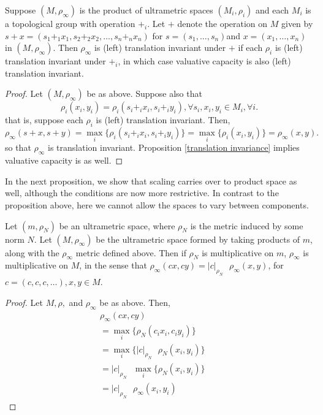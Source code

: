 \begin{proposition}
Suppose $(M,\rho_\infty)$ is the product of ultrametric spaces $(M_i, \rho_i)$ and each $M_i$ is a topological group with operation $+_i$. Let $+$ denote the operation on $M$ given by $s+x = (s_1 + _1 x_1, s_2 +_2 x_2, \ldots, s_n +_nx_n)$ for $s = (s_1,\ldots,s_n)$and $x =(x_1,\ldots,x_n)$ in $(M, \rho_\infty)$. Then $\rho_\infty$ is (left) translation invariant under $+$ if each $\rho_i$ is (left) translation invariant under $+_i$, in which case valuative capacity is also (left) translation invariant.
\end{proposition}

\begin{proof}
Let $(M,\rho_\infty)$ be as above. Suppose also that \[\rho_i(x_i,y_i) = \rho_i(s_i +_i x_i, s_i +_iy_i), \forall s_i, x_i, y_i \in M_i, \forall i.\] that is, suppose each $\rho_i$ is (left) translation invariant. Then,  
\[
\rho_\infty(s +x, s+y)  
= \max_i\{\rho_i(s_i +_ix_i, s_i +_i y_i)\} 
= \max_i\{\rho_i(x_i, y_i)\}
= \rho_\infty(x,y).
\] so that $\rho_\infty$ is translation invariant.  Proposition \ref{translation invariance} implies valuative capacity is as well. 
\end{proof}

In the next proposition, we show that scaling carries over to product space as well, although the conditions are now more restrictive. In contrast to the proposition above, here  we cannot allow the spaces to vary between components.\\

\begin{proposition}
Let $(m, \rho_N)$ be an ultrametric space, where $\rho_N$ is the metric induced by some norm $N$. Let $(M, \rho_{\infty})$ be the ultrametric space formed by taking products of $m$, along with the $\rho_\infty$ metric defined above.  Then if $\rho_N$ is multiplicative on $m$, $\rho_{\infty}$ is multiplicative on $M$, in the sense that $\rho_{\infty}(cx,cy) = \lvert c\rvert_{\rho_N} \text{ } \rho_\infty (x,y)$, for $c=(c,c,c,\ldots), x,y \in M$.
\end{proposition}

\begin{proof}
Let $M, \rho,$ and $\rho_{\infty}$ be as above. Then, 
\begin{align*}
\rho_\infty(cx, cy) && \\
= \max_i\{\rho_N(c_i x_i, c_i y_i)\} && \\
= \max_i\{\vert c \rvert_{\rho_N} \text{ }  \rho_N(x_i, y_i)\} && \\
= \vert c \rvert_{\rho_N} \text{ } \max_i\{\rho_N(x_i,y_i)\} && \\
= \vert c \rvert_{\rho_N} \text{ } \rho_\infty(x_i,y_i)
\end{align*}
\end{proof}


